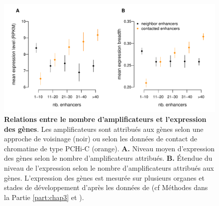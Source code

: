 \begin{figure}[hbt!]
 \centering
 \includegraphics[width=1\textwidth, page=1]{figures/chap2/chap2-fig7.pdf}
 \caption[Relations entre le nombre d'\glspl{amplificateur} et l'expression des gènes.]{
 \textbf{Relations entre le nombre d'\glspl{amplificateur} et l'expression des gènes}. Les \glspl{amplificateur} sont attribués aux gènes selon une approche de voisinage (noir) ou selon les données de contact de chromatine de type \gls{PCHi-C} (orange).
 \textbf{A.} Niveau moyen d'expression des gènes selon le nombre d'\glspl{amplificateur} attribués.
 \textbf{B.} \'Etendue du niveau de l'expression selon le nombre d'\glspl{amplificateur} attribués aux gènes.
 L'expression des gènes est mesurée sur plusieurs organes et stades de développement d'après les données de \cite{cardoso-moreira_gene_2019} (cf Méthodes dans la Partie \ref{part:chap3} et \citet{laverre_long-range_2022}).
 }
 \label{fig:chap2-fig7}
\end{figure} 

